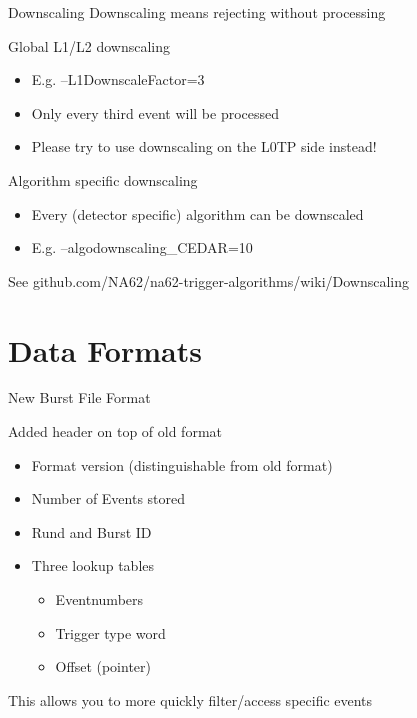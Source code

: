 \begin{frame}{Downscaling}{}
	Downscaling means rejecting without processing
	\begin{block}{Global L1/L2 downscaling}
		\begin{itemize}
		  \item E.g. --L1DownscaleFactor=3
		  \item Only every third event will be processed
		  \item Please try to use downscaling on the L0TP side instead!
		\end{itemize}
	\end{block}
	
	\begin{block}{Algorithm specific downscaling}
		\begin{itemize}
		  \item Every (detector specific) algorithm can be downscaled
		  \item E.g. --algodownscaling\_CEDAR=10
		\end{itemize}
	\end{block}
	
	\vspace{0.5cm}
	See github.com/NA62/na62-trigger-algorithms/wiki/Downscaling
\end{frame}


\section*{Data Formats}

\begin{frame}{New Burst File Format}{}
	\begin{block}{Added header on top of old format}
		\begin{itemize}
		  \item Format version (distinguishable from old format)
		  \item Number of Events stored
		  \item Rund and Burst ID
		  \item Three lookup tables
		  	\begin{itemize}
			  \item Eventnumbers
			  \item Trigger type word
			  \item Offset (pointer) 
			\end{itemize}
		\end{itemize}
	\end{block}
	This allows you to more quickly filter/access specific events	
\end{frame}

